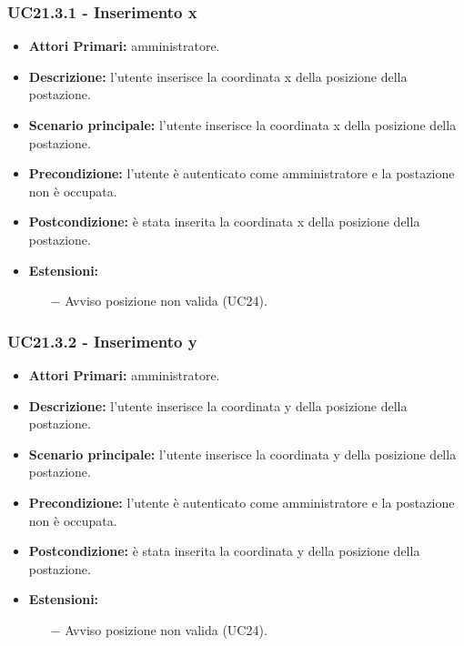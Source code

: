 \subsubsection{ UC21.3.1 - Inserimento x}
\begin{itemize}
	\item\textbf{Attori Primari:}
	amministratore.
	\item\textbf{Descrizione:}
	l'utente inserisce la coordinata x della posizione della postazione.
	\item\textbf{Scenario principale:} 
	l'utente inserisce la coordinata x della posizione della postazione.
	\item\textbf{Precondizione:} 
	l'utente è autenticato come amministratore e la postazione non è occupata.
	\item\textbf{Postcondizione:}
	è stata inserita la coordinata x della posizione della postazione.
	\item\textbf{Estensioni:}
	\begin{itemize}
		\item[$-$] Avviso posizione non valida (UC24).
	\end{itemize}
\end{itemize}

\subsubsection{ UC21.3.2 - Inserimento y}
\begin{itemize}
	\item\textbf{Attori Primari:}
	amministratore.
	\item\textbf{Descrizione:}
	l'utente inserisce la coordinata y della posizione della postazione.
	\item\textbf{Scenario principale:} 
	l'utente inserisce la coordinata y della posizione della postazione.
	\item\textbf{Precondizione:} 
	l'utente è autenticato come amministratore e la postazione non è occupata.
	\item\textbf{Postcondizione:}
	è stata inserita la coordinata y della posizione della postazione.
	\item\textbf{Estensioni:}
	\begin{itemize}
		\item[$-$] Avviso posizione non valida (UC24).
	\end{itemize}
\end{itemize}

